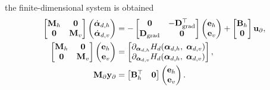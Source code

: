 the finite-dimensional system is obtained
\begin{equation}\label{eq:pHsys_findim_shwater}
\begin{aligned}
\begin{bmatrix}
\mathbf{M}_h & \mathbf{0} \\
\mathbf{0} & \mathbf{M}_v \\
\end{bmatrix}
\begin{pmatrix}
\dot{\bm{\alpha}}_{d, h} \\
\dot{\bm{\alpha}}_{d, v} \\
\end{pmatrix}
&= -\begin{bmatrix}
\mathbf{0} &  - \mathbf{D}_{\operatorname*{grad}}^\top \\
\mathbf{D}_{\operatorname*{grad}} & \mathbf{0} \\
\end{bmatrix} 
\begin{pmatrix}
\mathbf{e}_{h} \\
\mathbf{e}_{v} \\
\end{pmatrix} + 
\begin{bmatrix}
\mathbf{B}_h \\
\mathbf{0}\\
\end{bmatrix}
\mathbf{u}_\partial, \\
\begin{bmatrix}
\mathbf{M}_h & \mathbf{0} \\
\mathbf{0} & \mathbf{M}_v \\
\end{bmatrix}
\begin{pmatrix}
\mathbf{e}_{h} \\
\mathbf{e}_{v} \\
\end{pmatrix}
&= \begin{bmatrix}
\partial_{\bm{\alpha}_{d, h}} H_d(\bm{\alpha}_{d, h},\; \bm{\alpha}_{d, v})\\
\partial_{\bm{\alpha}_{d, v}} H_d(\bm{\alpha}_{d, h},\; \bm{\alpha}_{d, v})\\
\end{bmatrix}, \\
\mathbf{M}_\partial {\mathbf{y}_\partial} &= \begin{bmatrix}
\mathbf{B}_h^\top & \mathbf{0}
\end{bmatrix}\begin{pmatrix}
\mathbf{e}_{h} \\
\mathbf{e}_{v} \\
\end{pmatrix}.
\end{aligned}
\end{equation}
